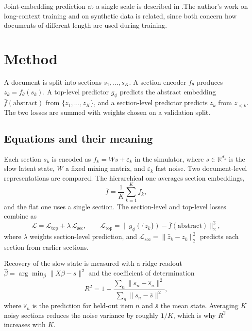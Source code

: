 \documentclass[conference]{IEEEtran}
\begin{document}
Joint-embedding prediction at a single scale is described in \cite{bardes2024vjepa}.The author's work on long-context training \cite{d6longcontext} and on synthetic data \cite{d5synthetic} is related, since both concern how documents of different length are used during training.

\section{Method}
A document is split into sections $s_1,\dots,s_K$. A section encoder $f_\theta$ produces $z_k = f_\theta(s_k)$. A top-level predictor $g_\phi$ predicts the abstract embedding $\bar{f}(\text{abstract})$ from $\{z_1,\dots,z_K\}$, and a section-level predictor predicts $z_k$ from $z_{<k}$. The two losses are summed with weights chosen on a validation split.

\subsection*{Equations and their meaning}
Each section $s_k$ is encoded as $f_k=W s+\varepsilon_k$ in the simulator, where $s\in\mathbb{R}^{d_z}$ is the slow latent state, $W$ a fixed mixing matrix, and $\varepsilon_k$ fast noise. Two document-level representations are compared. The hierarchical one averages section embeddings,
\begin{equation}
\bar f=\frac{1}{K}\sum_{k=1}^{K}f_k,
\end{equation}
and the flat one uses a single section. The section-level and top-level losses combine as
\begin{equation}
\mathcal{L}=\mathcal{L}_{\mathrm{top}}+\lambda\,\mathcal{L}_{\mathrm{sec}},\qquad \mathcal{L}_{\mathrm{top}}=\big\lVert g_{\phi}(\{z_k\})-\bar f(\mathrm{abstract})\big\rVert_2^2,
\end{equation}
where $\lambda$ weights section-level prediction, and $\mathcal{L}_{\mathrm{sec}}=\lVert \hat z_k-z_k\rVert_2^2$ predicts each section from earlier sections.

Recovery of the slow state is measured with a ridge readout $\hat\beta=\arg\min_\beta\lVert X\beta-s\rVert^2$ and the coefficient of determination
\begin{equation}
R^2=1-\frac{\sum_{n}\lVert s_n-\hat s_n\rVert^2}{\sum_{n}\lVert s_n-\bar s\rVert^2},
\end{equation}
where $\hat s_n$ is the prediction for held-out item $n$ and $\bar s$ the mean state. Averaging $K$ noisy sections reduces the noise variance by roughly $1/K$, which is why $R^2$ increases with $K$.
\end{document}
